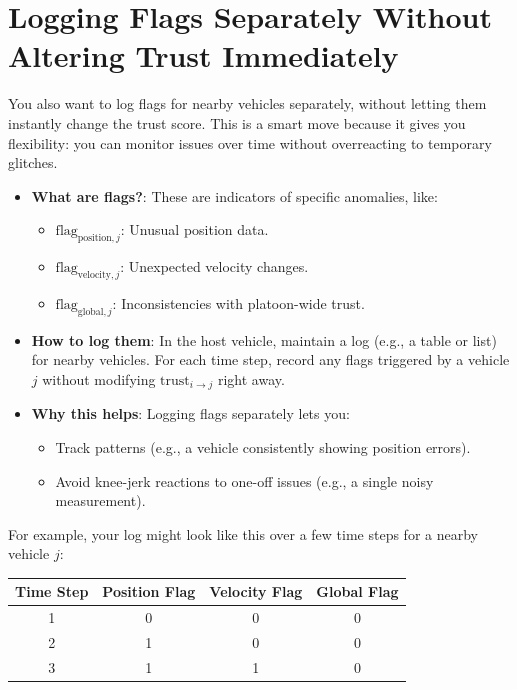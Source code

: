 \documentclass{article}
\begin{document}
\section{Logging Flags Separately Without Altering Trust Immediately}
You also want to log flags for nearby vehicles separately, without letting them instantly change the trust score. This is a smart move because it gives you flexibility: you can monitor issues over time without overreacting to temporary glitches.

\begin{itemize}
    \item \textbf{What are flags?}: These are indicators of specific anomalies, like:
    \begin{itemize}
        \item \( \text{flag}_{\text{position}, j} \): Unusual position data.
        \item \( \text{flag}_{\text{velocity}, j} \): Unexpected velocity changes.
        \item \( \text{flag}_{\text{global}, j} \): Inconsistencies with platoon-wide trust.
    \end{itemize}
    
    \item \textbf{How to log them}: In the host vehicle, maintain a log (e.g., a table or list) for nearby vehicles. For each time step, record any flags triggered by a vehicle \( j \) without modifying \( \text{trust}_{i \to j} \) right away.
    
    \item \textbf{Why this helps}: Logging flags separately lets you:
    \begin{itemize}
        \item Track patterns (e.g., a vehicle consistently showing position errors).
        \item Avoid knee-jerk reactions to one-off issues (e.g., a single noisy measurement).
    \end{itemize}
\end{itemize}

For example, your log might look like this over a few time steps for a nearby vehicle \( j \):

\begin{center}
    \begin{tabular}{cccc}
        \toprule
        Time Step & Position Flag & Velocity Flag & Global Flag \\
        \midrule
        1         & 0             & 0             & 0           \\
        2         & 1             & 0             & 0           \\
        3         & 1             & 1             & 0           \\
        \bottomrule
    \end{tabular}
\end{center}
\end{document}
